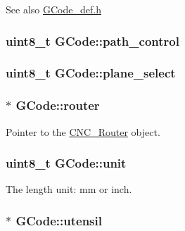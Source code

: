\begin{DoxySeeAlso}{See also}
\hyperlink{_g_code__def_8h}{G\+Code\+\_\+def.\+h} 
\end{DoxySeeAlso}
\hypertarget{class_g_code_a05307dd7b9ff2f74bfd81aed40104fa8}{
\subsubsection[{path\+\_\+control}]{\setlength{\rightskip}{0pt plus 5cm}uint8\+\_\+t G\+Code\+::path\+\_\+control}}\label{class_g_code_a05307dd7b9ff2f74bfd81aed40104fa8}
\hypertarget{class_g_code_a0f278ed4c1265656f062365ca345d353}{
\subsubsection[{plane\+\_\+select}]{\setlength{\rightskip}{0pt plus 5cm}uint8\+\_\+t G\+Code\+::plane\+\_\+select}}\label{class_g_code_a0f278ed4c1265656f062365ca345d353}
\hypertarget{class_g_code_ab060bb5bd169ae7640eb781bef6b78fe}{
\subsubsection[{router}]{$\ast$ G\+Code\+::router}}\label{class_g_code_ab060bb5bd169ae7640eb781bef6b78fe}


Pointer to the \hyperlink{class_c_n_c___router}{C\+N\+C\+\_\+\+Router} object. 

\hypertarget{class_g_code_a76a406426d6a80e3c08b0ecd09db3ffd}{
\subsubsection[{unit}]{\setlength{\rightskip}{0pt plus 5cm}uint8\+\_\+t G\+Code\+::unit}}\label{class_g_code_a76a406426d6a80e3c08b0ecd09db3ffd}


The length unit\+: mm or inch. 

\hypertarget{class_g_code_a9a737c33f133cf515926d0f2b612bd22}{
\subsubsection[{utensil}]{$\ast$ G\+Code\+::utensil}}\label{class_g_code_a9a737c33f133cf515926d0f2b612bd22}


